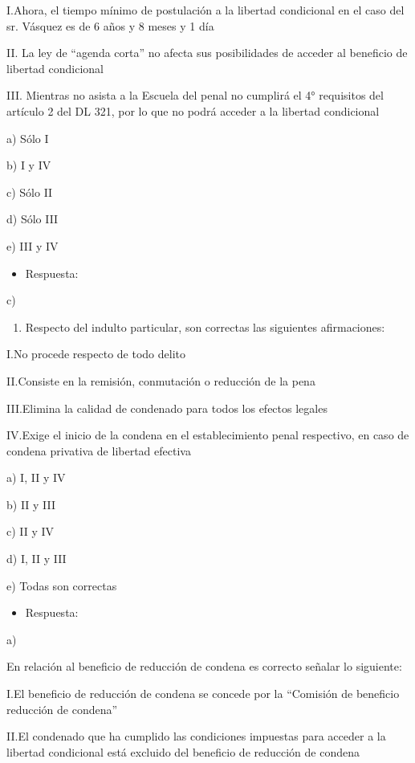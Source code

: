 \documentclass[letterpaper, 11pt]{article}
\begin{document}
I.Ahora, el tiempo mínimo de postulación a la libertad condicional en
el caso del sr.  Vásquez es de 6 años y 8 meses y 1 día

II. La ley de “agenda corta” no afecta sus posibilidades de acceder al
beneficio de libertad condicional

III. Mientras no asista a la Escuela del penal no cumplirá el 4°
requisitos del artículo 2 del DL 321, por lo que no podrá acceder a la
libertad condicional

a) Sólo I

b) I y IV

c) Sólo II

d) Sólo III

e) III y IV

\begin{itemize}
\item Respuesta:
\end{itemize}
c)


\begin{enumerate}
\item Respecto del indulto particular, son correctas las siguientes afirmaciones:
\end{enumerate}

I.No procede respecto de todo delito

II.Consiste en la remisión, conmutación o reducción de la pena

III.Elimina la calidad de condenado para todos los efectos legales

IV.Exige el inicio de la condena en el establecimiento penal respectivo, en caso de
condena privativa de libertad efectiva

a) I, II y IV

b) II y III

c) II y IV

d) I, II y III

e) Todas son correctas

\begin{itemize}
\item Respuesta:
\end{itemize}
a)


En relación al beneficio de reducción de condena es correcto señalar lo
siguiente:

I.El beneficio de reducción de condena se concede por la “Comisión de beneficio
reducción de condena”

II.El condenado que ha cumplido las condiciones impuestas para acceder a la libertad
condicional está excluido del beneficio de reducción de condena
\end{document}
